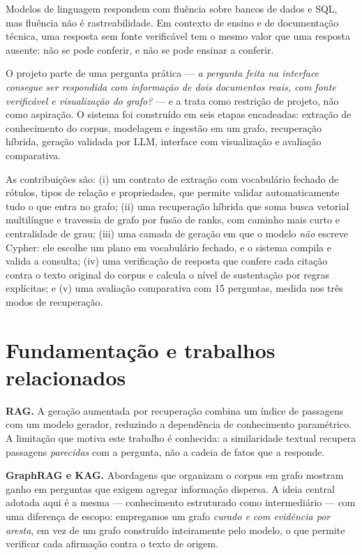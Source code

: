 \documentclass[12pt]{article}
\begin{document}
Modelos de linguagem respondem com fluência sobre bancos de dados e SQL, mas fluência não é
rastreabilidade. Em contexto de ensino e de documentação técnica, uma resposta sem fonte
verificável tem o mesmo valor que uma resposta ausente: não se pode conferir, e não se pode
ensinar a conferir.

O projeto parte de uma pergunta prática --- \emph{a pergunta feita na interface consegue ser
respondida com informação de dois documentos reais, com fonte verificável e visualização do
grafo?} --- e a trata como restrição de projeto, não como aspiração. O sistema foi construído em
seis etapas encadeadas: extração de conhecimento do corpus, modelagem e ingestão em um grafo,
recuperação híbrida, geração validada por LLM, interface com visualização e avaliação comparativa.

As contribuições são: (i) um contrato de extração com vocabulário fechado de rótulos, tipos de
relação e propriedades, que permite validar automaticamente tudo o que entra no grafo; (ii) uma
recuperação híbrida que soma busca vetorial multilíngue e travessia de grafo por fusão de ranks,
com caminho mais curto e centralidade de grau; (iii) uma camada de geração em que o modelo
\emph{não} escreve Cypher: ele escolhe um plano em vocabulário fechado, e o sistema compila e
valida a consulta; (iv) uma verificação de resposta que confere cada citação contra o texto
original do corpus e calcula o nível de sustentação por regras explícitas; e (v) uma avaliação
comparativa com 15 perguntas, medida nos três modos de recuperação.

\section{Fundamentação e trabalhos relacionados}

\textbf{RAG.} A geração aumentada por recuperação \cite{lewis2020} combina um índice de passagens
com um modelo gerador, reduzindo a dependência de conhecimento paramétrico. A limitação que motiva
este trabalho é conhecida: a similaridade textual recupera passagens \emph{parecidas} com a
pergunta, não a cadeia de fatos que a responde.

\textbf{GraphRAG e KAG.} Abordagens que organizam o corpus em grafo \cite{edge2024} mostram ganho
em perguntas que exigem agregar informação dispersa. A ideia central adotada aqui é a mesma ---
conhecimento estruturado como intermediário --- com uma diferença de escopo: empregamos um grafo
\emph{curado e com evidência por aresta}, em vez de um grafo construído inteiramente pelo modelo,
o que permite verificar cada afirmação contra o texto de origem.
\end{document}
